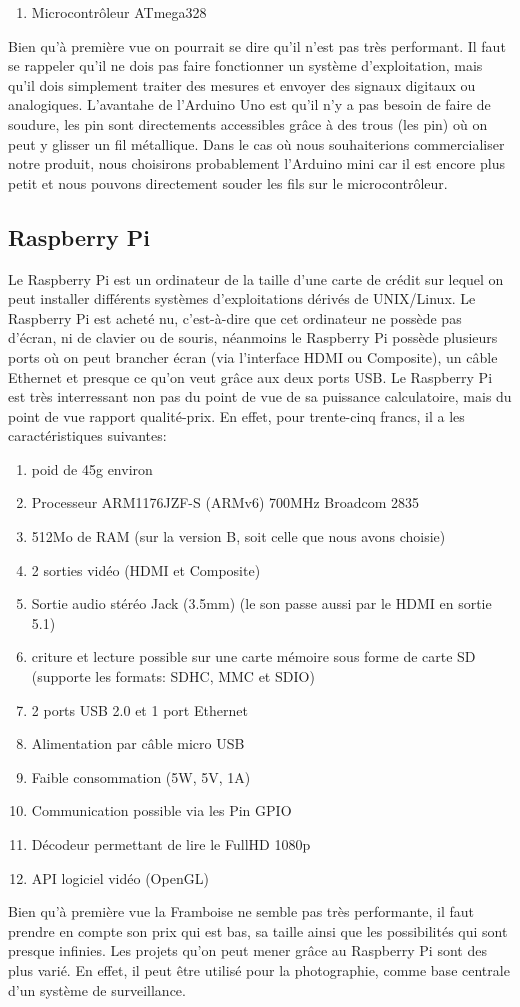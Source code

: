 \documentclass[a4paper,12pt]{article}
\begin{document}
{\begin{enumerate}
\item Microcontrôleur ATmega328
\end{enumerate}
Bien qu'à première vue on pourrait se dire qu'il n'est pas très performant. Il faut se rappeler qu'il ne dois pas faire fonctionner un système d'exploitation, mais qu'il dois simplement traiter des mesures et envoyer des signaux digitaux ou analogiques. L'avantahe de l'Arduino Uno est qu'il n'y a pas besoin de faire de soudure, les pin sont directements accessibles grâce à des trous (les pin) où on peut y glisser un fil métallique. Dans le cas où nous souhaiterions commercialiser notre produit, nous choisirons probablement l'Arduino mini car il est encore plus petit et nous pouvons directement souder les fils sur le microcontrôleur.

\subsection{Raspberry Pi}
Le Raspberry Pi\cite{RaspberryPiCaracteristiques} est un ordinateur de la taille d'une carte de crédit sur lequel on peut installer différents systèmes d'exploitations dérivés de UNIX/Linux. Le Raspberry Pi est acheté nu, c'est-à-dire que cet ordinateur ne possède pas d'écran, ni de clavier ou de souris, néanmoins le Raspberry Pi possède plusieurs ports où on peut brancher écran (via l'interface HDMI ou Composite), un câble Ethernet et presque ce qu'on veut grâce aux deux ports USB. Le Raspberry Pi est très interressant non pas du point de vue de sa puissance calculatoire, mais du point de vue rapport qualité-prix. En effet, pour trente-cinq francs, il a les caractéristiques suivantes: 
\begin{enumerate}
\item poid de 45g environ
\item Processeur ARM1176JZF-S (ARMv6) 700MHz Broadcom 2835
\item 512Mo de RAM (sur la version B, soit celle que nous avons choisie)
\item 2 sorties vidéo (HDMI et Composite) 
\item Sortie audio stéréo Jack (3.5mm) (le son passe aussi par le HDMI en sortie 5.1)
\item criture et lecture possible sur une carte mémoire sous forme de carte SD (supporte les formats: SDHC, MMC et SDIO)
\item 2 ports USB 2.0 et 1 port Ethernet
\item Alimentation par câble micro USB
\item Faible consommation (5W, 5V, 1A)
\item Communication possible via les Pin GPIO
\item Décodeur permettant de lire le FullHD  1080p
\item API logiciel vidéo (OpenGL)
\end{enumerate}
Bien qu'à première vue la Framboise ne semble pas très performante, il faut prendre en compte son prix qui est bas, sa taille ainsi que les possibilités qui sont presque infinies. Les projets qu'on peut mener grâce au Raspberry Pi sont des plus varié. En effet, il peut être utilisé pour la photographie, comme base centrale d'un système de surveillance. 

}
\end{document}
